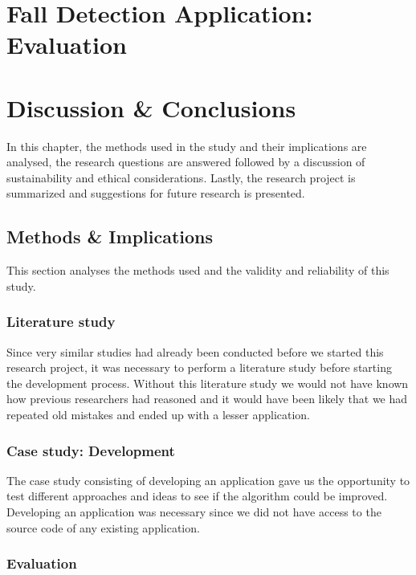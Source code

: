 \documentclass[12pt, a4paper, onecolumn]{article}
\begin{document}
	
	\newpage
	
	\section{Fall Detection Application: Evaluation}
	
\newpage
	
	\section{Discussion \& Conclusions}
	
	In this chapter, the methods used in the study and their implications are analysed, the research questions are answered followed by a discussion of sustainability and ethical considerations. Lastly, the research project is summarized and suggestions for future research is presented.
	
	\subsection{Methods \& Implications}
	
	This section analyses the methods used and the validity and reliability of this study.
	
	\subsubsection{Literature study}
	
	Since very similar studies had already been conducted before we started this research project, it was necessary to perform a literature study before starting the development process. Without this literature study we would not have known how previous researchers had reasoned and it would have been likely that we had repeated old mistakes and ended up with a lesser application.
	
	\subsubsection{Case study: Development}
	
	The case study consisting of developing an application gave us the opportunity to test different approaches and ideas to see if the algorithm could be improved. Developing an application was necessary since we did not have access to the source code of any existing application.
	
	\subsubsection{Evaluation}
	
\end{document}

